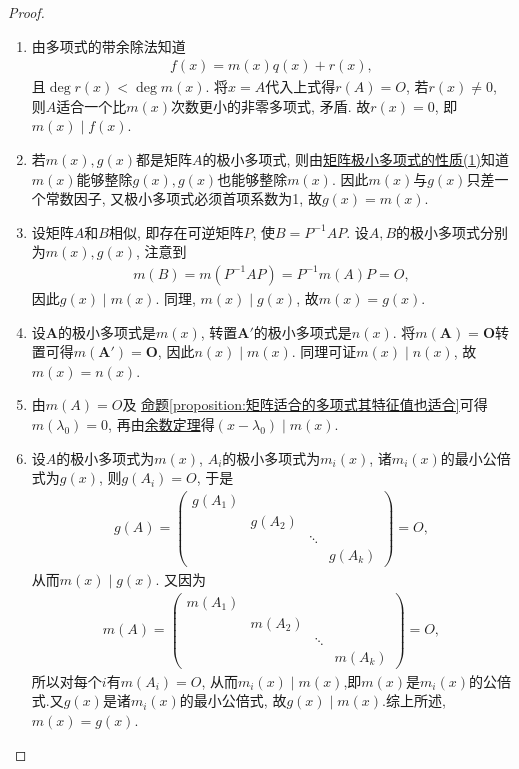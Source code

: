 \documentclass[../../main.tex]{subfiles}%
\begin{document}
\begin{proof}
\begin{enumerate}[(1)]
\item 由多项式的带余除法知道
\begin{align*}
f(x) = m(x)q(x) + r(x),
\end{align*}
且$\deg r(x) < \deg m(x)$. 将$x = A$代入上式得$r(A) = O$, 若$r(x) \neq 0$, 则$A$适合一个比$m(x)$次数更小的非零多项式, 矛盾. 故$r(x) = 0$, 即$m(x) \mid f(x)$.

\item 若$m(x), g(x)$都是矩阵$A$的极小多项式, 则由\hyperref[proposition:极小多项式的性质]{矩阵极小多项式的性质(1)}知道$m(x)$能够整除$g(x), g(x)$也能够整除$m(x)$. 因此$m(x)$与$g(x)$只差一个常数因子, 又极小多项式必须首项系数为1, 故$g(x) = m(x)$.

\item 设矩阵$A$和$B$相似, 即存在可逆矩阵$P$, 使$B = P^{-1}AP$. 设$A, B$的极小多项式分别为$m(x), g(x)$, 注意到
\begin{align*}
m(B) = m(P^{-1}AP) = P^{-1}m(A)P = O,
\end{align*}
因此$g(x) \mid m(x)$. 同理, $m(x) \mid g(x)$, 故$m(x) = g(x)$.

\item 设\(\boldsymbol{A}\)的极小多项式是\(m(x)\), 转置\(\boldsymbol{A}'\)的极小多项式是\(n(x)\). 将\(m(\boldsymbol{A}) = \boldsymbol{O}\)转置可得\(m(\boldsymbol{A}') = \boldsymbol{O}\), 因此\(n(x)\mid m(x)\). 同理可证\(m(x)\mid n(x)\), 故\(m(x) = n(x)\).

\item 由$m(A) = O$及
\hyperref[proposition:矩阵适合的多项式其特征值也适合]{命题\ref{proposition:矩阵适合的多项式其特征值也适合}}可得$m(\lambda_0) = 0$, 再由\hyperref[theorem:余数定理]{余数定理}得$(x - \lambda_0) \mid m(x)$.

\item 设$A$的极小多项式为$m(x)$, $A_i$的极小多项式为$m_i(x)$, 诸$m_i(x)$的最小公倍式为$g(x)$, 则$g(A_i) = O$, 于是
\begin{align*}
g(A) = \begin{pmatrix}
g(A_1) & & \\
& g(A_2) & \\
& & \ddots & \\
& & & g(A_k)
\end{pmatrix} = O,
\end{align*}
从而$m(x) \mid g(x)$. 又因为
\begin{align*}
m(A) = \begin{pmatrix}
m(A_1) & & \\
& m(A_2) & \\
& & \ddots & \\
& & & m(A_k)
\end{pmatrix} = O,
\end{align*}
所以对每个$i$有$m(A_i) = O$, 从而$m_i(x) \mid m(x)$,即$m(x)$是$m_i(x)$的公倍式.又$g(x)$是诸$m_i(x)$的最小公倍式, 故$g(x) \mid m(x)$.综上所述,$m(x) = g(x)$.
\end{enumerate}
\end{proof}
\end{document}
